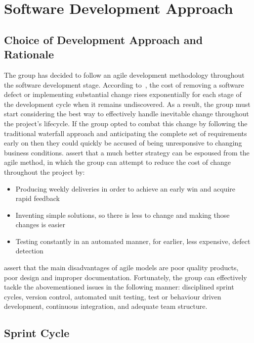 \section{Software Development Approach}

\subsection{Choice of Development Approach and Rationale}

The group has decided to follow an agile development methodology throughout the software development stage. According to~\textcite{book:software_engineering_economics}, the cost of removing a software defect or implementing substantial change rises exponentially for each stage of the development cycle when it remains undiscovered. As a result, the group must start considering the best way to effectively handle inevitable change throughout the project’s lifecycle. If the group opted to combat this change by following the traditional waterfall approach and anticipating the complete set of requirements early on then they could quickly be accused of being unresponsive to changing business conditions. \textcite{art:agile_business_innovation} assert that a much better strategy can be espoused from the agile method, in which the group can attempt to reduce the cost of change throughout the project by:

\begin{itemize}
  \item Producing weekly deliveries in order to achieve an early win and acquire rapid feedback
  \item Inventing simple solutions, so there is less to change and making those changes is easier
  \item Testing constantly in an automated manner, for earlier, less expensive, defect detection
\end{itemize}

\textcite{art:adaptive_sdpm} assert that the main disadvantages of agile models are poor quality products, poor design and improper documentation. Fortunately, the group can effectively tackle the abovementioned issues in the following manner: disciplined sprint cycles, version control, automated unit testing, test or behaviour driven development, continuous integration, and adequate team structure.

\subsection{Sprint Cycle}

